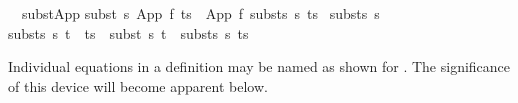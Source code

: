 \begin{isabellebody}
\ \ subst{}App{}\isanewline
{}subst\ s\ {}App\ f\ ts{}\ {}\ App\ f\ {}substs\ s\ ts{}{}\ {}\isanewline
\isanewline
{}substs\ s\ {}{}\ {}\ {}{}{}\ {}\isanewline
{}substs\ s\ {}t\ {}\ ts{}\ {}\ subst\ s\ t\ {}\ substs\ s\ ts{}%
\begin{isamarkuptext}%
\noindent
Individual equations in a  definition may be
named as shown for .
The significance of this device will become apparent below.


\end{isamarkuptext}
\end{isabellebody}
